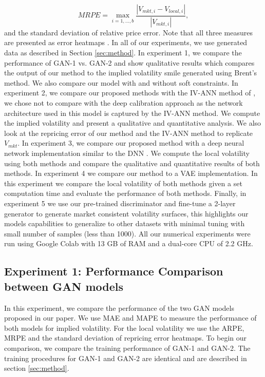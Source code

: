 \documentclass{article}
\theoremstyle{plain}%
\theoremstyle{definition}
\theoremstyle{remark}
\begin{document}
\begin{equation*}
	MRPE = \max_{i=1,...,b}\frac{|V_{mkt,i}-V_{local,i}|}{|V_{mkt,i}|},
\end{equation*}
and the standard deviation of relative price error. Note that all three measures are presented as error heatmaps \citep{horvath-2021}. In all of our experiments, we use generated data as described in Section \ref{sec:method}. In experiment 1, we compare the performance of GAN-1 vs. GAN-2 and show qualitative results which compares the output of our method to the implied volatility smile generated using Brent's method. We also compare our model with and without soft constraints. In experiment 2, we compare our proposed methods with the IV-ANN method of \citep{liu-2019-1}, we chose not to compare with the deep calibration \citep{horvath-2021} approach as the network architecture used in this model is captured by the IV-ANN method. We compute the implied volatility and present a qualitative and quantitative analysis. We also look at the repricing error of our method and the IV-ANN method to replicate $V_{mkt}$. In experiment 3, we compare our proposed method with a deep neural network implementation similar to the DNN \citep{chataigner-2020}. We compute the local volatility using both methods and compare the qualitative and quantitative results of both methods. In experiment 4 we  compare our method to a VAE implementation. In this experiment we compare the local volatility of both methods given a set computation time and evaluate the performance of both methods. Finally, in experiment 5 we use our pre-trained discriminator and fine-tune a 2-layer generator to generate market consistent volatility surfaces, this highlights our models capabilities to generalize to other datasets with minimal tuning with small number of samples (less than 1000). All our numerical experiments were run using Google Colab with 13 GB of RAM and a dual-core CPU of 2.2 GHz.

\subsection{Experiment 1: Performance Comparison between GAN models}

In this experiment, we compare the performance of the two GAN models proposed in our paper. We use MAE and MAPE to measure the performance of both models for implied volatility. For the local volatility we use the ARPE, MRPE and the standard deviation of repricing error heatmaps. To begin our comparison, we compare the training performance of GAN-1 and GAN-2. The training procedures for GAN-1 and GAN-2 are identical and are described in section \ref{sec:method}. 
\end{document}
